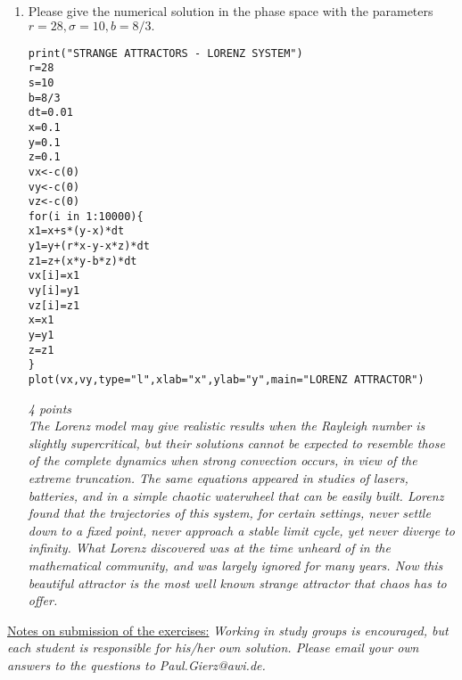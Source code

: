 \documentclass[a4paper,12pt]{article}
\begin{document}
\begin{enumerate}
\item 
      Please give the numerical solution in the phase space with the parameters $ r=28, \sigma=10,b=8/3. $

\begin{verbatim}
print("STRANGE ATTRACTORS - LORENZ SYSTEM")
r=28
s=10
b=8/3
dt=0.01
x=0.1
y=0.1
z=0.1
vx<-c(0)
vy<-c(0)
vz<-c(0)
for(i in 1:10000){
x1=x+s*(y-x)*dt
y1=y+(r*x-y-x*z)*dt
z1=z+(x*y-b*z)*dt
vx[i]=x1
vy[i]=y1
vz[i]=z1
x=x1
y=y1
z=z1
}
plot(vx,vy,type="l",xlab="x",ylab="y",main="LORENZ ATTRACTOR")
\end{verbatim}


 \textit{ 4 points} \\[2ex]

{\it The Lorenz model may give realistic results when the Rayleigh number is slightly supercritical, but their solutions cannot be expected to resemble those of the complete dynamics when strong convection occurs, in view of the extreme truncation. 
The same equations appeared in studies of lasers, batteries, and in a simple chaotic waterwheel that can be easily built. 
Lorenz found that the trajectories of this system, for certain settings, never settle down to a fixed point, never approach a stable limit cycle, yet never diverge to infinity. What Lorenz discovered was at the time unheard of in the mathematical community, and was largely ignored for many years. Now this beautiful attractor is the most well known strange attractor that chaos has to offer.
 }
  


\end{enumerate}

\vfill
\underline{Notes on submission of the exercises:}
 \textit{
Working in study groups  is encouraged, but each student is responsible for his/her own solution.
Please email your own answers to the questions to Paul.Gierz@awi.de.
}
\end{document}
